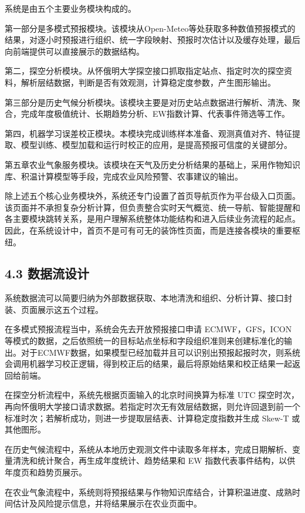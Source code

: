 系统是由五个主要业务模块构成的。

第一部分是多模式预报模块。该模块从Open-Meteo等处获取多种数值预报模式的结果，对逐小时预报进行组织、统一字段映射、预报时次估计以及缓存处理，最后向前端提供可以直接展示的数据结构。

第二，探空分析模块。从怀俄明大学探空接口抓取指定站点、指定时次的探空资料，解析层结数据，判断是否有效观测，计算稳定度参数，产生图形输出。

第三部分是历史气候分析模块。该模块主要是对历史站点数据进行解析、清洗、聚合，完成年度极值统计、长期趋势分析、EW指数计算、代表事件筛选等工作。

第四，机器学习误差校正模块。本模块完成训练样本准备、观测真值对齐、特征提取、模型训练、模型加载和运行时校正的应用，是提高预报可信度的关键部分。

第五章农业气象服务模块。该模块在天气及历史分析结果的基础上，采用作物知识库、积温计算模型等手段，完成农业风险预警、农事建议的输出。

除上述五个核心业务模块外，系统还专门设置了首页导航页作为平台级入口页面。该页面并不承担复杂分析计算，但负责整合实时天气概览、统一导航、智能提醒和各主要模块跳转关系，是用户理解系统整体功能结构和进入后续业务流程的起点。因此，在系统设计中，首页不是可有可无的装饰性页面，而是连接各模块的重要枢纽。

\subsection{4.3 数据流设计}

系统数据流可以简要归纳为外部数据获取、本地清洗和组织、分析计算、接口封装、页面展示这五个过程。

在多模式预报流程当中，系统会先去开放预报接口申请 ECMWF，GFS，ICON 等模式的数据，之后依照统一的目标站点坐标和字段组织准则来创建标准化的输出。对于ECMWF数据，如果模型已经加载并且可以识别出预报起报时次，则系统会调用机器学习校正逻辑，得到校正后的结果，最后将原始结果和校正结果一起返回给前端。

在探空分析流程中，系统先根据页面输入的北京时间换算为标准 UTC 探空时次，再向怀俄明大学接口请求数据。若指定时次无有效层结数据，则允许回退到前一个标准时次；若解析成功，则进一步提取层结表、计算稳定度指数并生成 Skew-T 或其他图形。

在历史气候流程中，系统从本地历史观测文件中读取多年样本，完成日期解析、变量清洗和统计聚合，再生成年度统计、趋势结果和 EW 指数代表事件结构，以供年度页和趋势页展示。

在农业气象流程中，系统则将预报结果与作物知识库结合，计算积温进度、成熟时间估计及风险提示信息，并将结果展示在农业页面中。

